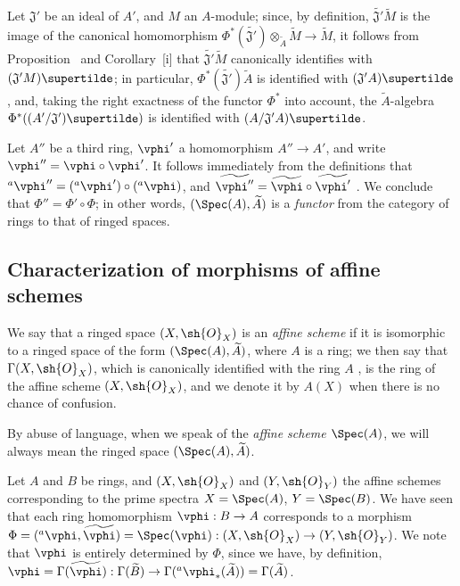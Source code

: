 \begin{env}[1.6.9]
\label{I.1.6.9}
Let $\mathfrak{J}'$ be an ideal of $A'$, and $M$ an $A$-module;
since, by definition, $\widetilde{\mathfrak{J}'}\widetilde{M}$ is the image of the canonical homomorphism $\Phi^*(\widetilde{\mathfrak{J}'})\otimes_{\widetilde{A}}\widetilde{M}\to\widetilde{M}$, it
follows from Proposition~ and Corollary~[i] that
$\widetilde{\mathfrak{J}'}\widetilde{M}$ canonically identifies with $(\mathfrak{J}' M)\supertilde$;
in particular, $\Phi^*(\widetilde{\mathfrak{J}'})\widetilde{A}$ is identified with $(\mathfrak{J}' A)\supertilde$, and, taking the right exactness of the functor $\Phi^*$ into account,
the $\widetilde{A}$-algebra $\Phi^*((A'/\mathfrak{J}')\supertilde)$ is identified with $(A/\mathfrak{J}' A)\supertilde$.
\end{env}

\begin{env}[1.6.10]
\label{I.1.6.10}
Let $A''$ be a third ring, $\vphi'$ a homomorphism $A''\to A'$, and write $\vphi''=\vphi\circ\vphi'$.
It follows immediately from the definitions that ${}^a\vphi''=({}^a\vphi')\circ({}^a\vphi)$, and $\widetilde{\vphi''}=\widetilde{\vphi}\circ\widetilde{\vphi'}$ . We conclude that $\Phi''=\Phi'\circ\Phi$;
in other words, $(\Spec(A),\widetilde{A})$ is a \emph{functor} from the category of rings to that of ringed spaces.
\end{env}

\subsection{Characterization of morphisms of affine schemes}
\label{subsection:I.1.7}

\begin{definition}[1.7.1]
\label{I.1.7.1}
We say that a ringed space $(X,\sh{O}_X)$ is an \emph{affine scheme} if it is isomorphic to a ringed space of the form $(\Spec(A),\widetilde{A})$, where $A$ is a ring;
we then say that $\Gamma(X,\sh{O}_X)$, which is canonically identified with the ring $A$ , is the ring of the affine scheme $(X,\sh{O}_X)$, and we denote it by $A(X)$ when there is no chance of confusion.
\end{definition}

By abuse of language, when we speak of the \emph{affine scheme $\Spec(A)$}, we will always mean the ringed space $(\Spec(A),\widetilde{A})$.
\begin{env}[1.7.2]
\label{I.1.7.2}
Let $A$ and $B$ be rings, and $(X,\sh{O}_X)$ and $(Y,\sh{O}_Y)$ the affine schemes corresponding to the prime spectra $X=\Spec(A)$, $Y=\Spec(B)$.
We have seen  that each ring homomorphism $\vphi:B\to A$ corresponds to a morphism $\Phi=({}^a\vphi,\widetilde{\vphi})=\Spec(\vphi):(X,\sh{O}_X)\to(Y,\sh{O}_Y)$.
We note that $\vphi$ is entirely determined by $\Phi$, since we have, by definition, $\vphi=\Gamma(\widetilde{\vphi}):\Gamma(\widetilde{B})\to\Gamma({}^a\vphi_*(\widetilde{A}))=\Gamma(\widetilde{A})$.
\end{env}

